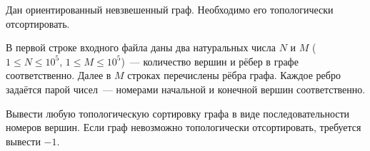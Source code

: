 Дан ориентированный невзвешенный граф. Необходимо его топологически отсортировать.

\InputFile
В первой строке входного файла даны два натуральных числа $N$ и $M$
(${1 \leqslant N \leqslant 10^5}$, ${1 \leqslant M \leqslant 10^5}$)~---
количество вершин и рёбер в графе соответственно. Далее в $M$ строках перечислены рёбра графа. Каждое ребро задаётся
парой чисел~--- номерами начальной и конечной вершин соответственно.

\OutputFile
Вывести любую топологическую сортировку графа в виде последовательности номеров вершин. Если граф невозможно топологически отсортировать, требуется вывести $-1$.
